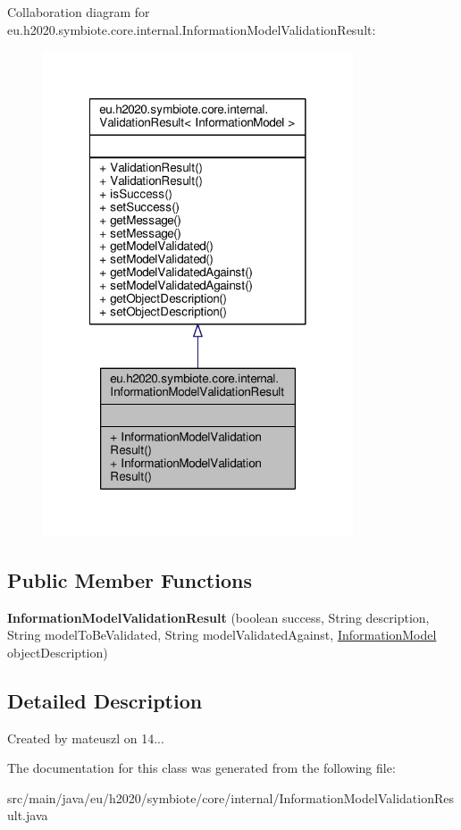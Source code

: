 Collaboration diagram for eu.\+h2020.\+symbiote.\+core.\+internal.\+Information\+Model\+Validation\+Result\+:\nopagebreak
\begin{figure}[H]
\begin{center}
\leavevmode
\includegraphics[width=260pt]{classeu_1_1h2020_1_1symbiote_1_1core_1_1internal_1_1InformationModelValidationResult__coll__graph}
\end{center}
\end{figure}
\subsection*{Public Member Functions}
\begin{DoxyCompactItemize}
\item 
\mbox{\label{classeu_1_1h2020_1_1symbiote_1_1core_1_1internal_1_1InformationModelValidationResult_ab423dc1f089e6ec2c4205439e72b0756}} 
{\bfseries Information\+Model\+Validation\+Result} (boolean success, String description, String model\+To\+Be\+Validated, String model\+Validated\+Against, \hyperlink{classeu_1_1h2020_1_1symbiote_1_1model_1_1mim_1_1InformationModel}{Information\+Model} object\+Description)
\end{DoxyCompactItemize}


\subsection{Detailed Description}
Created by mateuszl on 14... 

The documentation for this class was generated from the following file\+:\begin{DoxyCompactItemize}
\item 
src/main/java/eu/h2020/symbiote/core/internal/Information\+Model\+Validation\+Result.\+java\end{DoxyCompactItemize}
